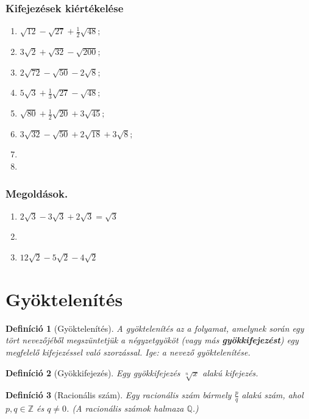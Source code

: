 \documentclass{article}
\newtheorem{definition}{Definíció}
\begin{document}
\subsubsection{Kifejezések kiértékelése}
\begin{enumerate} %
    \item $\sqrt{12} - \sqrt{27} + \frac{1}{2}\sqrt{48};$
    \item $3\sqrt{2} + \sqrt{32} - \sqrt{200};$
    \item $2\sqrt{72} - \sqrt{50} - 2\sqrt{8};$
    \item $5\sqrt{3} + \frac{1}{3}\sqrt{27} - \sqrt{48};$
    \item $\sqrt{80} + \frac{1}{2}\sqrt{20} + 3\sqrt{45};$
    \item $3\sqrt{32} - \sqrt{50} + 2\sqrt{18} + 3\sqrt{8};$
    \item 
    \item 
\end{enumerate}
\subsubsection{Megoldások.} %
\begin{enumerate}
    \item $2\sqrt{3} - 3\sqrt{3} + 2\sqrt{3} = \sqrt{3}$
    \item 
    \item $12\sqrt{2} - 5\sqrt{2} - 4\sqrt{2}$
\end{enumerate}


\section{Gyöktelenítés}
\begin{definition}[Gyöktelenítés]
    A gyöktelenítés az a folyamat, amelynek során egy tört nevezőjéből megszüntetjük a négyzetgyököt (vagy más \textbf{gyökkifejezést}) egy megfelelő kifejezéssel való szorzással. Ige: a nevező gyöktelenítése.
\end{definition}

\begin{definition}[Gyökkifejezés]
    Egy gyökkifejezés $\sqrt[n]{x}$ alakú kifejezés.
\end{definition}

\begin{definition}[Racionális szám]
    Egy racionális szám bármely $\frac{p}{q}$ alakú szám, ahol
$p,q\in\mathbb{Z}$ és $q\ne0$. (A racionális számok halmaza $\mathbb{Q}$.)
\end{definition}
\end{document}
